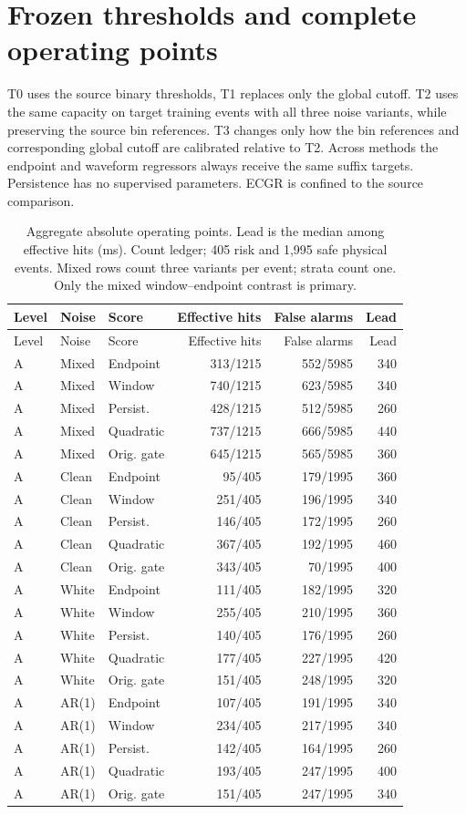 \documentclass[10pt]{article}
\begin{document}
\section{Frozen thresholds and complete operating points}
T0 uses the source binary thresholds, T1 replaces only the global cutoff. T2 uses the same capacity on target training events with all three noise variants, while preserving the source bin references. T3 changes only how the bin references and corresponding global cutoff are calibrated relative to T2. Across methods the endpoint and waveform regressors always receive the same suffix targets. Persistence has no supervised parameters. ECGR is confined to the source comparison.
\begingroup\small\setlength{\tabcolsep}{3.8pt}
\begin{longtable}{lllrrr}
\caption{Aggregate absolute operating points. Lead is the median among effective hits (ms). Count ledger; 405 risk and 1,995 safe physical events. Mixed rows count three variants per event; strata count one. Only the mixed window--endpoint contrast is primary.}\\
\toprule Level & Noise & Score & Effective hits & False alarms & Lead \\\midrule\endfirsthead
\toprule Level & Noise & Score & Effective hits & False alarms & Lead \\\midrule\endhead
A & Mixed & Endpoint & 313/1215 & 552/5985 & 340 \\
A & Mixed & Window & 740/1215 & 623/5985 & 340 \\
A & Mixed & Persist. & 428/1215 & 512/5985 & 260 \\
A & Mixed & Quadratic & 737/1215 & 666/5985 & 440 \\
A & Mixed & Orig. gate & 645/1215 & 565/5985 & 360 \\
A & Clean & Endpoint & 95/405 & 179/1995 & 360 \\
A & Clean & Window & 251/405 & 196/1995 & 340 \\
A & Clean & Persist. & 146/405 & 172/1995 & 260 \\
A & Clean & Quadratic & 367/405 & 192/1995 & 460 \\
A & Clean & Orig. gate & 343/405 & 70/1995 & 400 \\
A & White & Endpoint & 111/405 & 182/1995 & 320 \\
A & White & Window & 255/405 & 210/1995 & 360 \\
A & White & Persist. & 140/405 & 176/1995 & 260 \\
A & White & Quadratic & 177/405 & 227/1995 & 420 \\
A & White & Orig. gate & 151/405 & 248/1995 & 320 \\
A & AR(1) & Endpoint & 107/405 & 191/1995 & 340 \\
A & AR(1) & Window & 234/405 & 217/1995 & 340 \\
A & AR(1) & Persist. & 142/405 & 164/1995 & 260 \\
A & AR(1) & Quadratic & 193/405 & 247/1995 & 400 \\
A & AR(1) & Orig. gate & 151/405 & 247/1995 & 340 \\
\bottomrule\end{longtable}\endgroup
\end{document}
